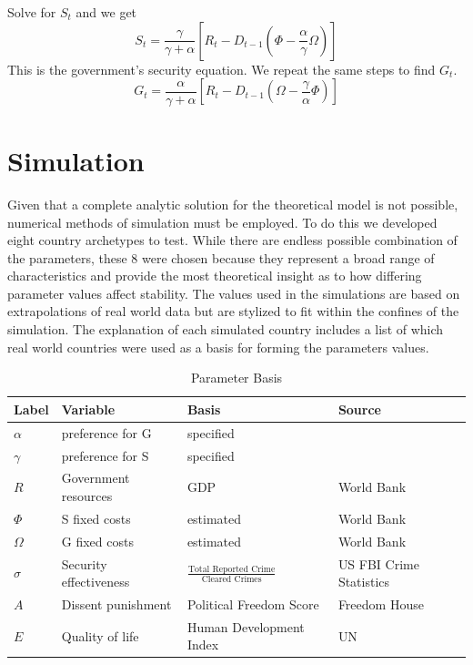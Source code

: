 \documentclass[12pt]{article}
\begin{document}
\begin{spacing}{1.5}
\noindent Solve for $S_t$ and we get
\begin{equation}
S_t=\frac{\gamma }{\gamma  +\alpha} \left[ R_t - D_{t-1} \left(\Phi - \frac{\alpha}{\gamma }\Omega \right) \right]
\end{equation}
\noindent This is the government's security equation. We repeat the same steps to find $G_t$. 
\begin{equation}
G_t=\frac{\alpha}{\gamma  +\alpha} \left[ R_t - D_{t-1} \left(\Omega - \frac{\gamma }{\alpha}\Phi \right) \right]
\end{equation}


\section{Simulation} 

Given that a complete analytic solution for the theoretical model is not possible, numerical methods of simulation must be employed. To do this we developed eight country archetypes to test. While there are endless possible combination of the parameters, these 8 were chosen because they represent a broad range of characteristics and provide the most theoretical insight as to how differing parameter values affect stability. The values used in the simulations are based on extrapolations of real world data but are stylized to fit within the confines of the simulation. The explanation of each simulated country includes a list of which real world countries were used as a basis for forming the parameters values. 

\begin{table}[]
\centering
\begin{tiny}
\caption{Parameter Basis}
\begin{tabular}{llll}
\toprule
\textbf{Label} & \textbf{Variable} & \textbf{Basis} & \textbf{Source} \\ \hline
$\alpha$ & preference for G & specified &  \\
\textbf{$\gamma$} & preference for S & specified &  \\
\textbf{$R$} & Government resources & GDP & World Bank \\
$\Phi$ & S fixed costs & estimated & World Bank \\
\textbf{$\Omega$} & G fixed costs & estimated & World Bank \\
\textbf{$\sigma$} & Security effectiveness & $\frac{\text{Total Reported Crime}}{\text{Cleared Crimes}}$ & US FBI Crime Statistics \\
\textbf{$A$} & Dissent punishment & Political Freedom Score & Freedom House \\
\textbf{$E$} & Quality of life & Human Development Index & UN \\ \hline
\end{tabular}
\end{tiny}
\end{table}


\end{spacing}
\end{document}
